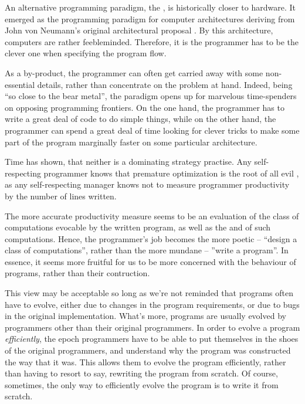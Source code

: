 An alternative programming paradigm, the , is historically
closer to hardware. It emerged as the programming paradigm for computer
architectures deriving from John von Neumann's original architectural proposal
\cite{von-neumann}. By this architecture, computers are rather feebleminded.
Therefore, it is the programmer has to be the clever one when specifying the
program flow.

As a by-product, the programmer can often get carried away with some
non-essential details, rather than concentrate on the problem at hand. Indeed,
being ``so close to the bear metal'', the paradigm opens up for marvelous
time-spenders on opposing programming frontiers. On the one hand, the
programmer has to write a great deal of code to do simple things, while on the
other hand, the programmer can spend a great deal of time looking for clever
tricks to make some part of the program marginally faster on some particular
architecture.

Time has shown, that neither is a dominating strategy practise. Any
self-respecting programmer knows that premature optimization is the root of all
evil \cite{knuth-goto}, as any self-respecting manager knows not to measure
programmer productivity by the number of lines written.


The more accurate productivity measure seems to be an evaluation of the class
of computations evocable by the written program, as well as the  and
  of such computations. Hence, the programmer's
job becomes the more poetic -- ``design a class of computations'', rather than
the more mundane -- ''write a program''. In essence, it seems more fruitful for
us to be more concerned with the behaviour of programs, rather than their
contruction.

This view may be acceptable so long as we're not reminded that programs often
have to evolve, either due to changes in the program requirements, or due to
bugs in the original implementation. What's more, programs are usually evolved
by programmers other than their original programmers. In order to evolve a
program \emph{efficiently}, the epoch programmers have to be able to put
themselves in the shoes of the original programmers, and understand why the
program was constructed the way that it was.  This allows them to evolve the
program efficiently, rather than having to resort to say, rewriting the program
from scratch. Of course, sometimes, the only way to efficiently evolve the
program is to write it from scratch. 

